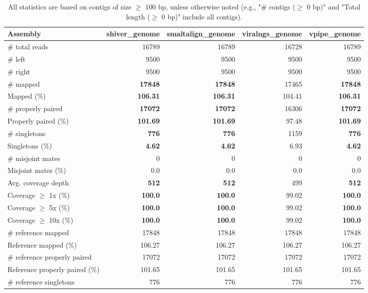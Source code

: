 \documentclass[12pt,a4paper]{article}
\begin{document}
\begin{table}[ht]
\begin{center}
\caption{All statistics are based on contigs of size $\geq$ 100 bp, unless otherwise noted (e.g., "\# contigs ($\geq$ 0 bp)" and "Total length ($\geq$ 0 bp)" include all contigs).}
\begin{tabular}{|l*{4}{|r}|}
\hline
Assembly & shiver\_genome & smaltalign\_genome & viralngs\_genome & vpipe\_genome \\ \hline
\# total reads & 16789 & 16789 & 16728 & 16789 \\ \hline
\# left & 9500 & 9500 & 9500 & 9500 \\ \hline
\# right & 9500 & 9500 & 9500 & 9500 \\ \hline
\# mapped & {\bf 17848} & {\bf 17848} & 17465 & {\bf 17848} \\ \hline
Mapped (\%) & {\bf 106.31} & {\bf 106.31} & 104.41 & {\bf 106.31} \\ \hline
\# properly paired & {\bf 17072} & {\bf 17072} & 16306 & {\bf 17072} \\ \hline
Properly paired (\%) & {\bf 101.69} & {\bf 101.69} & 97.48 & {\bf 101.69} \\ \hline
\# singletons & {\bf 776} & {\bf 776} & 1159 & {\bf 776} \\ \hline
Singletons (\%) & {\bf 4.62} & {\bf 4.62} & 6.93 & {\bf 4.62} \\ \hline
\# misjoint mates & 0 & 0 & 0 & 0 \\ \hline
Misjoint mates (\%) & 0.0 & 0.0 & 0.0 & 0.0 \\ \hline
Avg. coverage depth & {\bf 512} & {\bf 512} & 499 & {\bf 512} \\ \hline
Coverage $\geq$ 1x (\%) & {\bf 100.0} & {\bf 100.0} & 99.02 & {\bf 100.0} \\ \hline
Coverage $\geq$ 5x (\%) & {\bf 100.0} & {\bf 100.0} & 99.02 & {\bf 100.0} \\ \hline
Coverage $\geq$ 10x (\%) & {\bf 100.0} & {\bf 100.0} & 99.02 & {\bf 100.0} \\ \hline
\# reference mapped & 17848 & 17848 & 17848 & 17848 \\ \hline
Reference mapped (\%) & 106.27 & 106.27 & 106.27 & 106.27 \\ \hline
\# reference properly paired & 17072 & 17072 & 17072 & 17072 \\ \hline
Reference properly paired (\%) & 101.65 & 101.65 & 101.65 & 101.65 \\ \hline
\# reference singletons & 776 & 776 & 776 & 776 \\ \hline

\end{tabular}
\end{center}
\end{table}
\end{document}
